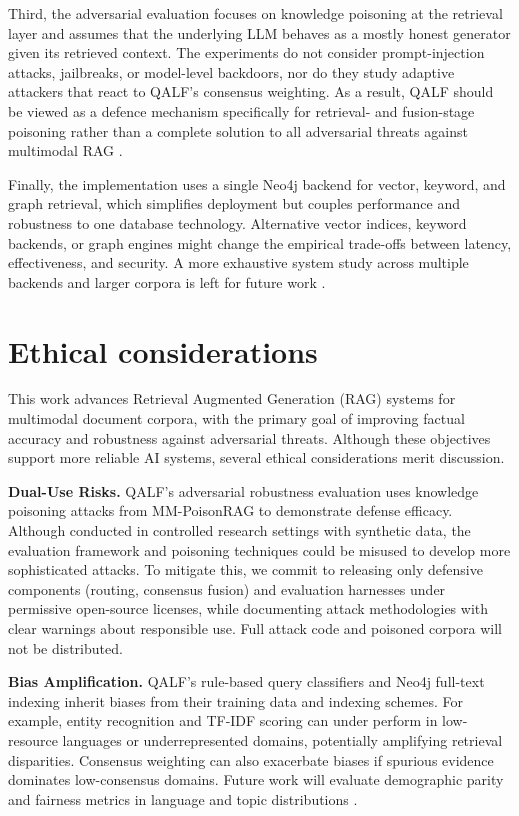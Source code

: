 \documentclass[11pt]{article}
\begin{document}
Third, the adversarial evaluation focuses on knowledge poisoning at the retrieval layer and assumes that the underlying LLM behaves as a mostly honest generator given its retrieved context. The experiments do not consider prompt-injection attacks, jailbreaks, or model-level backdoors, nor do they study adaptive attackers that react to QALF’s consensus weighting. As a result, QALF should be viewed as a defence mechanism specifically for retrieval- and fusion-stage poisoning rather than a complete solution to all adversarial threats against multimodal RAG \cite{ha_mm-poisonrag_2025,shi_making_2025}.

Finally, the implementation uses a single Neo4j backend for vector, keyword, and graph retrieval, which simplifies deployment but couples performance and robustness to one database technology. Alternative vector indices, keyword backends, or graph engines might change the empirical trade-offs between latency, effectiveness, and security. A more exhaustive system study across multiple backends and larger corpora is left for future work \cite{lee_hybgrag_2025,ahmad_benchmarking_2025}.

\section*{Ethical considerations}

This work advances Retrieval Augmented Generation (RAG) systems for multimodal document corpora, with the primary goal of improving factual accuracy and robustness against adversarial threats. Although these objectives support more reliable AI systems, several ethical considerations merit discussion.

\textbf{Dual-Use Risks.} QALF's adversarial robustness evaluation uses knowledge poisoning attacks from MM-PoisonRAG \cite{ha_mm-poisonrag_2025} to demonstrate defense efficacy. Although conducted in controlled research settings with synthetic data, the evaluation framework and poisoning techniques could be misused to develop more sophisticated attacks. To mitigate this, we commit to releasing only defensive components (routing, consensus fusion) and evaluation harnesses under permissive open-source licenses, while documenting attack methodologies with clear warnings about responsible use. Full attack code and poisoned corpora will not be distributed.

\textbf{Bias Amplification.} QALF's rule-based query classifiers and Neo4j full-text indexing inherit biases from their training data and indexing schemes. For example, entity recognition and TF-IDF scoring can under perform in low-resource languages or underrepresented domains, potentially amplifying retrieval disparities. Consensus weighting can also exacerbate biases if spurious evidence dominates low-consensus domains. Future work will evaluate demographic parity and fairness metrics in language and topic distributions \cite{mei_survey_2025}.
\end{document}
